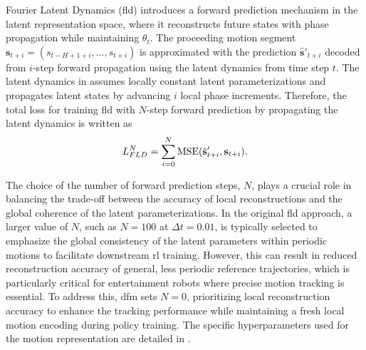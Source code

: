 Fourier Latent Dynamics (\ac{fld}) introduces a forward prediction mechanism in the latent representation space, where it reconstructs future states with phase propagation while maintaining $\theta_t$.
The proceeding motion segment $\mathbf{s}_{t+i} = (s_{t-H+1+i}, \dots, s_{t+i})$ is approximated with the prediction $\hat{\mathbf{s}}'_{t+i}$ decoded from $i$-step forward propagation using the latent dynamics from time step $t$.
The latent dynamics in  assumes locally constant latent parameterizations and propagates latent states by advancing $i$ local phase increments.
Therefore, the total loss for training \ac{fld} with $N$-step forward prediction by propagating the latent dynamics is written as
\begin{equation}
\begin{split}
    L_{FLD}^N = \sum_{i=0}^N \operatorname*{MSE}(\hat{\mathbf{s}}'_{t+i}, \mathbf{s}_{t+i}).
    \label{eqn:total_loss}
\end{split}
\end{equation}

The choice of the number of forward prediction steps, $N$, plays a crucial role in balancing the trade-off between the accuracy of local reconstructions and the global coherence of the latent parameterizations.
In the original \ac{fld} approach, a larger value of $N$, such as $N = 100$ at $\Delta t = 0.01$, is typically selected to emphasize the global consistency of the latent parameters within periodic motions to facilitate downstream \ac{rl} training.
However, this can result in reduced reconstruction accuracy of general, less periodic reference trajectories, which is particularly critical for entertainment robots where precise motion tracking is essential.
To address this, \ac{dfm} sets $N=0$, prioritizing local reconstruction accuracy to enhance the tracking performance while maintaining a fresh local motion encoding during policy training.
The specific hyperparameters used for the motion representation are detailed in . 

